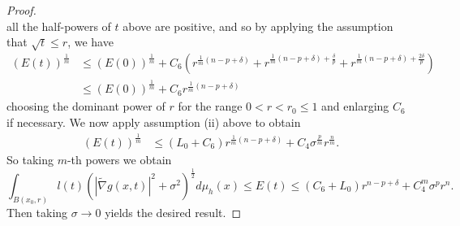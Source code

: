 \documentclass[12pt]{amsart}
\theoremstyle{plain}
\theoremstyle{plain}
\theoremstyle{definition}
\theoremstyle{remark}
\numberwithin{equation}{subsection}
\newcommand{\hdel}{\tilde{\nabla}}
\begin{document}
\begin{proof}
\begin{equation*}
    \end{equation*}
    all the half-powers of $t$ above are positive, and so by applying the assumption that $\sqrt{t}\leq r$, we have
    \begin{align*}
        \left(E(t)\right)^{\frac{1}{m}} &\leq \left(E(0)\right)^\frac{1}{m} + C_6\left(r^{\frac{1}{m}\left(n-p+\delta\right)} + r^{\frac{1}{m}\left(n-p+\delta\right)+\frac{\delta}{p}} + r^{\frac{1}{m}\left(n-p+\delta\right)+\frac{2\delta}{p}}\right) \nonumber \\
        &\leq \left(E(0)\right)^\frac{1}{m} + C_6r^{\frac{1}{m}\left(n-p+\delta\right)}
    \end{align*}
    choosing the dominant power of $r$ for the range $0 < r < r_0 \leq 1$ and enlarging $C_6$ if necessary. We now apply assumption (ii) above to obtain
    \begin{align*}
        \left(E(t)\right)^{\frac{1}{m}} &\leq (L_0 + C_6)r^{\frac{1}{m}\left(n-p+\delta\right)} + C_4\sigma^\frac{p}{m}r^{\frac{n}{m}}.
    \end{align*}
    So taking $m$-th powers we obtain
    \begin{equation*}
        \int_{B(x_0, r)} l(t)\left(|\hdel g(x,t)|^2 + \sigma^2\right)^{\frac{1}{2}}d\mu_h(x) \leq E(t) \leq (C_6+L_0)r^{n-p+\delta} + C_4^m\sigma^p r^n.
    \end{equation*}
    Then taking $\sigma \to 0$ yields the desired result.
    \begin{comment}
    For $p > 1$, we consider the quantity
    \begin{equation}
        Q^p = \left(|\hdel g|^2 + \sigma^2\right)^\frac{p}{2}
    \end{equation}
    which satisfies the inequality
    \begin{align}
        \frac{\partial}{\partial t} Q^p &\leq g^{ij}\hdel_i\hdel_j Q^p - p(p-1)Q^{p-2}|\hdel Q|^2 + C_2Q^{p+2} + C_3Q^{p-1} \nonumber \\
        &\leq g^{ij}\hdel_i\hdel_j Q^p - p(p-1)Q^{p-2}|\hdel Q|^2 + C_2B_1t^{-1+\frac{\delta}{p}}Q^p + C_3Q^p \nonumber \\
        &\leq g^{ij}\hdel_i\hdel_j Q^p + C_2B_1t^{-1+\frac{\delta}{p}}Q^p + C_3Q^p.
    \end{align}
    Hence
    \begin{equation}
        \frac{\partial}{\partial t} (l(t)Q^p) \leq g^{ij}\hdel_i\hdel_j(lQ^p)
    \end{equation}
    for $l(t) = \exp\left(-A(t^\frac{\delta}{p}+t)\right)$ for $A > 0$ large enough. Let $\Phi$ be the same cut-off function as before and we define

\end{comment}
\end{proof}
\end{document}
